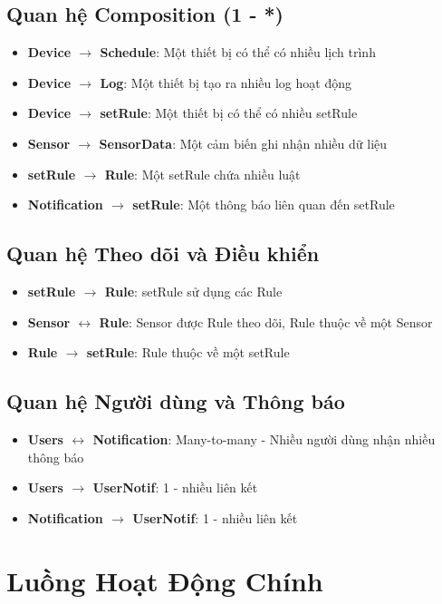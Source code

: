 \documentclass[12pt,a4paper]{article}
\begin{document}
\subsection{Quan hệ Composition (1 - *)}
\begin{itemize}
    \item \textbf{Device $\rightarrow$ Schedule}: Một thiết bị có thể có nhiều lịch trình
    \item \textbf{Device $\rightarrow$ Log}: Một thiết bị tạo ra nhiều log hoạt động
    \item \textbf{Device $\rightarrow$ setRule}: Một thiết bị có thể có nhiều setRule
    \item \textbf{Sensor $\rightarrow$ SensorData}: Một cảm biến ghi nhận nhiều dữ liệu
    \item \textbf{setRule $\rightarrow$ Rule}: Một setRule chứa nhiều luật
    \item \textbf{Notification $\rightarrow$ setRule}: Một thông báo liên quan đến setRule
\end{itemize}

\subsection{Quan hệ Theo dõi và Điều khiển}
\begin{itemize}
    \item \textbf{setRule $\rightarrow$ Rule}: setRule sử dụng các Rule
    \item \textbf{Sensor $\leftrightarrow$ Rule}: Sensor được Rule theo dõi, Rule thuộc về một Sensor
    \item \textbf{Rule $\rightarrow$ setRule}: Rule thuộc về một setRule
\end{itemize}

\subsection{Quan hệ Người dùng và Thông báo}
\begin{itemize}
    \item \textbf{Users $\leftrightarrow$ Notification}: Many-to-many - Nhiều người dùng nhận nhiều thông báo
    \item \textbf{Users $\rightarrow$ UserNotif}: 1 - nhiều liên kết
    \item \textbf{Notification $\rightarrow$ UserNotif}: 1 - nhiều liên kết
\end{itemize}

\section{Luồng Hoạt Động Chính}
\end{document}
